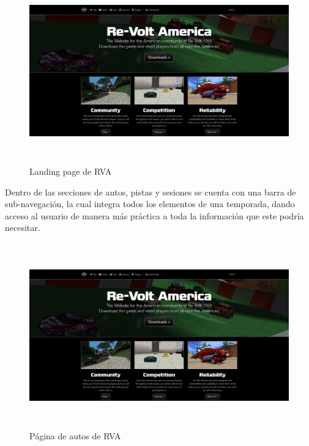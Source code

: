 \begin{figure}[H]
  \begin{center}
    \includegraphics[width=15cm, height=8cm]{img/landing.png} 
  \end{center}
  \caption[Landing page de RVA]{Landing page de RVA}
  \label{fig:landing}
\end{figure}

Dentro de las secciones de autos, pistas y sesiones se cuenta con una barra de sub-navegación, la cual integra todos los elementos de una temporada, dando acceso al usuario de manera más práctica a toda la información que este podría necesitar.

\begin{figure}[H]
  \begin{center}
    \includegraphics[width=15cm, height=8cm]{img/landing.png} 
  \end{center}
  \caption[Página de autos de RVA]{Página de autos de RVA}
  \label{fig:cars}
\end{figure}

